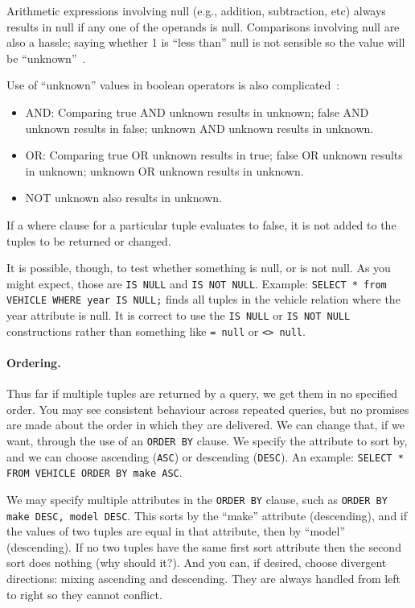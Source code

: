 Arithmetic expressions involving null (e.g., addition, subtraction, etc) always results in null if any one of the operands is null. Comparisons involving null are also a hassle; saying whether 1 is ``less than'' null is not sensible so the value will be ``unknown''~\cite{dsc}.

Use of ``unknown'' values in boolean operators is also complicated~\cite{dsc}:

\begin{itemize}
	\item  AND: Comparing true AND unknown results in unknown; false AND unknown results in false; unknown AND unknown results in unknown.
	\item OR: Comparing true OR unknown results in true; false OR unknown results in unknown; unknown OR unknown results in unknown.
	\item NOT unknown also results in unknown.
\end{itemize}

If a where clause for a particular tuple evaluates to false, it is not added to the tuples to be returned or changed. 

It is possible, though, to test whether something is null, or is not null. As you might expect, those are \texttt{IS NULL} and \texttt{IS NOT NULL}. Example: \texttt{SELECT * from VEHICLE WHERE year IS NULL;} finds all tuples in the vehicle relation where the year attribute is null. It is correct to use the \texttt{IS NULL} or \texttt{IS NOT NULL} constructions rather than something like \texttt{= null} or \texttt{<> null}.


\paragraph{Ordering.} Thus far if multiple tuples are returned by a query, we get them in no specified order. You may see consistent behaviour across repeated queries, but no promises are made about the order in which they are delivered. We can change that, if we want, through the use of an \texttt{ORDER BY} clause. We specify the attribute to sort by, and we can choose ascending (\texttt{ASC}) or descending (\texttt{DESC}). An example: \texttt{SELECT * FROM VEHICLE ORDER BY make ASC}.

We may specify multiple attributes in the \texttt{ORDER BY} clause, such as \texttt{ORDER BY make DESC, model DESC}. This sorts by the ``make'' attribute (descending), and if the values of two tuples are equal in that attribute, then by ``model'' (descending). If no two tuples have the same first sort attribute then the second sort does nothing (why should it?). And you can, if desired, choose divergent directions: mixing ascending and descending. They are always handled from left to right so they cannot conflict.

